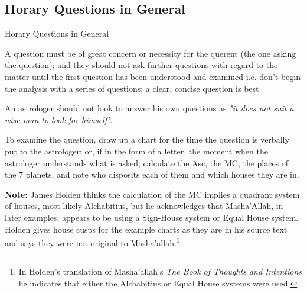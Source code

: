 \subsection{Horary Questions in General}
\begin{frame}[t]{Horary Questions in General}

A question must be of great concern or necessity for the querent (the one asking the question); and they should not ask further questions with regard to the matter until the first question has been understood and examined i.e. don't begin the analysis with a series of questions; a clear, concise question is best

An astrologer should not look to answer his own questions as \textsl{"it does not suit a wise man to look for himself"}. 

To examine the question, draw up a chart for the time the question is verbally put to the astrologer; or, if in the form of a letter, the moment when the astrologer understands what is asked; calculate the Asc, the MC, the places of the 7 planets, and note who disposits each of them and which houses they are in.
\vspace{0.25cm}
\begin{mdframed}[backgroundcolor=gray!5, rightmargin=2em, leftmargin=2em]
\small
\textbf{Note:} James Holden thinks the calculation of the MC implies a quadrant system of houses, most likely Alchabitius, but he acknowledges that Masha'Allah, in later examples, appears to be using a Sign-House system or Equal House system. Holden gives house cusps for the example charts as they are in his source text and says they were not original to Masha'allah.\footnote{In Holden's translation of Masha'allah's \textsl{The Book of Thoughts and Intentions} he indicates that either the Alchabitius or Equal House systems were used.}
\end{mdframed}

\end{frame}